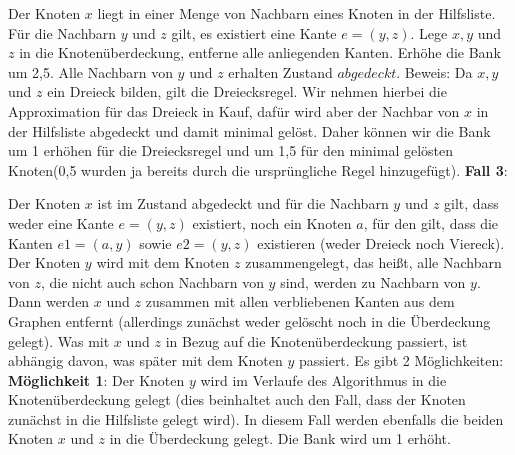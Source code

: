 \documentclass[12pt,onecolumn, notitlepage]{scrartcl}
\begin{document}
Der Knoten $x$ liegt in einer Menge von Nachbarn eines Knoten in der Hilfsliste. Für die Nachbarn $y$ und $z$ gilt, es existiert eine Kante $ e = (y,z)$. Lege $x,y$ und $z$ in die Knotenüberdeckung, entferne alle anliegenden Kanten. Erhöhe die Bank um 2,5. Alle Nachbarn von $y$ und $z$ erhalten Zustand $abgedeckt$. \newline
Beweis: Da $x,y$ und $z$ ein Dreieck bilden, gilt die Dreiecksregel. Wir nehmen hierbei die Approximation für das Dreieck in Kauf, dafür wird aber der Nachbar von $x$ in der Hilfsliste abgedeckt und damit minimal gelöst. Daher können wir die Bank um 1 erhöhen für die Dreiecksregel und um 1,5 für den minimal gelösten Knoten(0,5 wurden ja bereits durch die ursprüngliche Regel hinzugefügt).\newline\newline
\textbf{Fall 3}:\newline
\begin{center}
\end{center}
Der Knoten $x$ ist im Zustand abgedeckt und für die Nachbarn $y$ und $z$ gilt, dass weder eine Kante $e = (y,z)$ existiert, noch ein Knoten $a$, für den gilt, dass die Kanten $e1 = (a,y)$ sowie $e2 = (y,z)$ existieren (weder Dreieck noch Viereck). Der Knoten $y$ wird mit dem Knoten $z$ zusammengelegt, das heißt, alle Nachbarn von $z$, die nicht auch schon Nachbarn von $y$ sind, werden zu Nachbarn von $y$. Dann werden $x$ und $z$ zusammen mit allen verbliebenen Kanten aus dem Graphen entfernt (allerdings zunächst weder gelöscht noch in die Überdeckung gelegt). Was mit $x$ und $z$ in Bezug auf die Knotenüberdeckung passiert, ist abhängig davon, was später mit dem Knoten $y$ passiert. Es gibt 2 Möglichkeiten:\newline \newline
\textbf{Möglichkeit 1}:\newline
Der Knoten $y$ wird im Verlaufe des Algorithmus in die Knotenüberdeckung gelegt (dies beinhaltet auch den Fall, dass der Knoten zunächst in die Hilfsliste gelegt wird). In diesem Fall werden ebenfalls die beiden Knoten $x$ und $z$ in die Überdeckung gelegt. Die Bank wird um 1 erhöht. \newline \newline
\end{document}

